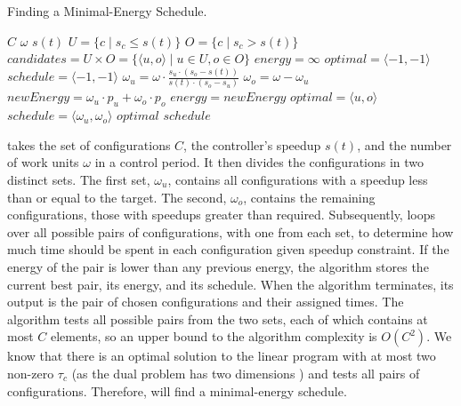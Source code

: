 \begin{algorithm}[t]
  \caption{Finding a Minimal-Energy Schedule.}
  \begin{algorithmic}
    \footnotesize
    \Require $C$ 
    \Require $\omega$ 
    \Require $s(t)$ 
    \State $U = \{c \mid s_c \le s(t) \}$
    \State $O = \{c \mid s_c > s(t)\}$
    \State $candidates = U \times O = \{\langle u, o \rangle \mid u \in U, o \in O\}$
    \State $energy = \infty$
    \State $optimal = \langle -1, -1 \rangle$
    \State $schedule = \langle -1, -1 \rangle$ \newline
     
    \State $\omega_u = \omega \cdot \frac{s_u \cdot (s_o - s(t))}{s(t) \cdot (s_o - s_u)}$ 
    \State $\omega_o = \omega - \omega_u$
    \State $newEnergy = \omega_u \cdot p_u + \omega_o \cdot p_o$ 
     
    \State $energy = newEnergy$
    \State $optimal = \langle u, o \rangle$
    \State $schedule = \langle \omega_u,\omega_o \rangle$
    \EndIf
    \EndFor \newline \newline
    \Return $optimal$  \newline
    \Return $schedule$ 
  \end{algorithmic}
  \label{algo:poet-optimal}
\end{algorithm}

 takes the set of configurations $C$, the controller's speedup $s(t)$, and the number of work units $\omega$ in a control period.
It then divides the configurations in two distinct sets.
The first set, $\omega_u$, contains all configurations with a speedup less than or equal to the target.
The second, $\omega_o$, contains the remaining configurations, \ie those with speedups greater than required.
Subsequently,  loops over all possible pairs of configurations, with one from each set, to determine how much time should be spent in each configuration given speedup constraint.
If the energy of the pair is lower than any previous energy, the algorithm stores the current best pair, its energy, and its schedule.
When the algorithm terminates, its output is the pair of chosen configurations and their assigned times.
The algorithm tests all possible pairs from the two sets, each of which contains at most $C$ elements, so an upper bound to the algorithm complexity is $O(C^2)$.
We know that there is an optimal solution to the linear program with at most two non-zero $\tau_c$ (as the dual problem has two dimensions \cite{LP}) and  tests all pairs of configurations.
Therefore,  will find a minimal-energy schedule.



